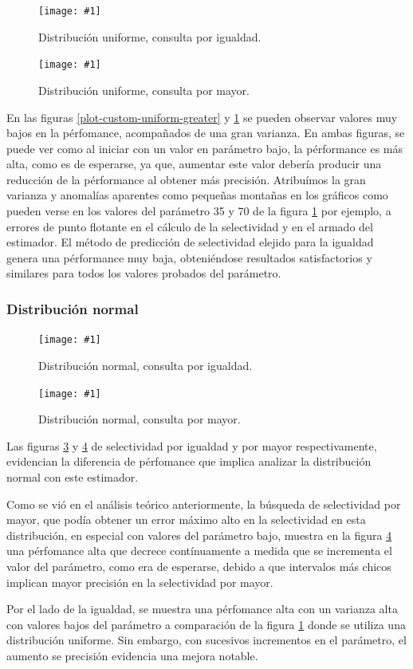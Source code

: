 \documentclass[a4paper, 10pt, twoside]{article}
\newcommand{\grafico}[3]{
  \begin{figure}[H]
    \texttt{[image: \#1]}
    \caption{#2}
    \label{#3}
  \end{figure}
}
\begin{document}
\grafico{plot-hist-uniform-equal}
        {Distribución uniforme, consulta por igualdad.}
        {plot-hist-uniform-equal}
\grafico{plot-hist-uniform-greater}
        {Distribución uniforme, consulta por mayor.}
        {plot-hist-uniform-greater}

En las figuras \ref{plot-custom-uniform-greater} y \ref{plot-hist-uniform-equal} se pueden observar valores muy bajos
en la pérfomance, acompañados de una gran varianza. En ambas figuras, se puede ver como al iniciar con un valor en parámetro bajo,
la pérformance es más alta, como es de esperarse, ya que, aumentar este valor debería producir una reducción de la pérformance al obtener más precisión.
Atribuímos la gran varianza y anomalías aparentes como pequeñas montañas en los gráficos como pueden verse en los
valores del parámetro 35 y 70 de la figura \ref{plot-hist-uniform-equal} por ejemplo, a errores de punto flotante en el cálculo de la selectividad y en el armado del estimador.
El método de predicción de selectividad elejido para la igualdad genera una pérformance muy baja, obteniéndose resultados satisfactorios y similares para todos los valores probados del parámetro.

\subsubsection{Distribución normal}


\grafico{plot-hist-normal-equal}
        {Distribución normal, consulta por igualdad.}
        {plot-hist-normal-equal}
\grafico{plot-hist-normal-greater}
        {Distribución normal, consulta por mayor.}
        {plot-hist-normal-greater}

Las figuras \ref{plot-hist-normal-equal} y \ref{plot-hist-normal-greater} de selectividad por igualdad y por mayor respectivamente, evidencian la diferencia 
de pérfomance que implica analizar la distribución normal con este estimador.

Como se vió en el análisis teórico anteriormente, la búsqueda de selectividad por mayor, que podía obtener un error máximo 
alto en la selectividad en esta distribución, en especial con valores del parámetro bajo, muestra en la figura \ref{plot-hist-normal-greater} una pérfomance alta 
que decrece contínuamente a medida que se incrementa el valor del parámetro, como era de esperarse, debido a que intervalos más chicos implican 
mayor precisión en la selectividad por mayor.

Por el lado de la igualdad, se muestra una pérfomance alta con un varianza alta con valores bajos del parámetro a comparación de la figura \ref{plot-hist-uniform-equal} 
donde se utiliza una distribución uniforme. Sin embargo, con sucesivos incrementos en el parámetro, el aumento se precisión evidencia una mejora notable.   
\end{document}
